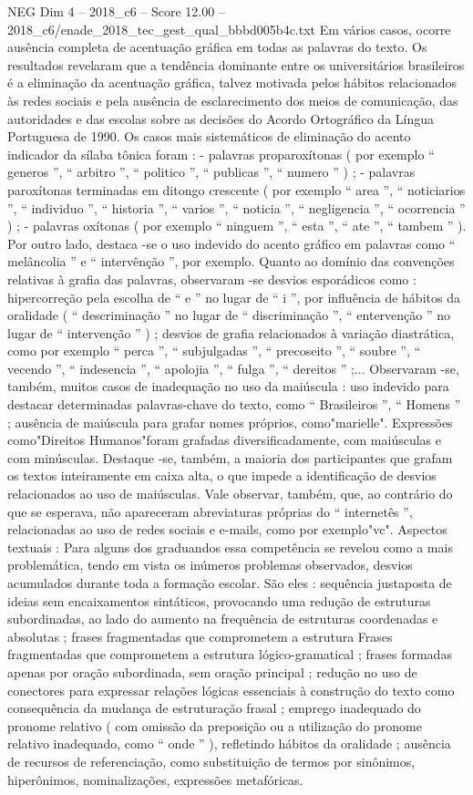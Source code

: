 \begin{textsample}{NEG Dim 4 – 2018\_c6 – Score 12.00 – 2018\_c6/enade\_2018\_tec\_gest\_qual\_bbbd005b4c.txt}
Em vários casos, ocorre ausência completa de acentuação gráfica em todas as palavras do texto.
Os resultados revelaram que a tendência dominante entre os universitários brasileiros é a eliminação da acentuação gráfica, talvez motivada pelos hábitos relacionados às redes sociais e pela ausência de esclarecimento dos meios de comunicação, das autoridades e das escolas sobre as decisões do Acordo Ortográfico da Língua Portuguesa de 1990.
Os casos mais sistemáticos de eliminação do acento indicador da sílaba tônica foram : - palavras proparoxítonas ( por exemplo “ generos ”, “ arbitro ”, “ politico ”, “ publicas ”, “ numero ” ) ; - palavras paroxítonas terminadas em ditongo crescente ( por exemplo “ area ”, “ noticiarios ”, “ individuo ”, “ historia ”, “ varios ”, “ noticia ”, “ negligencia ”, “ ocorrencia ” ) ; - palavras oxítonas ( por exemplo “ ninguem ”, “ esta ”, “ ate ”, “ tambem ” ).
Por outro lado, destaca -se o uso indevido do acento gráfico em palavras como “ melâncolia ” e “ intervênção ”, por exemplo.
Quanto ao domínio das convenções relativas à grafia das palavras, observaram -se desvios esporádicos como : hipercorreção pela escolha de “ e ” no lugar de “ i ”, por influência de hábitos da oralidade ( “ descriminação ” no lugar de “ discriminação ”, “ entervenção ” no lugar de “ intervenção ” ) ; desvios de grafia relacionados à variação diastrática, como por exemplo “ perca ”, “ subjulgadas ”, “ precoseito ”, “ soubre ”, “ vecendo ”, “ indesencia ”, “ apolojia ”, “ fulga ”, “ dereitos ” ;...
Observaram -se, também, muitos casos de inadequação no uso da maiúscula : uso indevido para destacar determinadas palavras-chave do texto, como “ Brasileiros ”, “ Homens ” ; ausência de maiúscula para grafar nomes próprios, como"marielle".
Expressões como"Direitos Humanos"foram grafadas diversificadamente, com maiúsculas e com minúsculas.
Destaque -se, também, a maioria dos participantes que grafam os textos inteiramente em caixa alta, o que impede a identificação de desvios relacionados ao uso de maiúsculas.
Vale observar, também, que, ao contrário do que se esperava, não apareceram abreviaturas próprias do “ internetês ”, relacionadas ao uso de redes sociais e e-mails, como por exemplo"vc".
Aspectos textuais : Para alguns dos graduandos essa competência se revelou como a mais problemática, tendo em vista os inúmeros problemas observados, desvios acumulados durante toda a formação escolar.
São eles : sequência justaposta de ideias sem encaixamentos sintáticos, provocando uma redução de estruturas subordinadas, ao lado do aumento na frequência de estruturas coordenadas e absolutas ; frases fragmentadas que comprometem a estrutura Frases fragmentadas que comprometem a estrutura lógico-gramatical ; frases formadas apenas por oração subordinada, sem oração principal ; redução no uso de conectores para expressar relações lógicas essenciais à construção do texto como consequência da mudança de estruturação frasal ; emprego inadequado do pronome relativo ( com omissão da preposição ou a utilização do pronome relativo inadequado, como “ onde ” ), refletindo hábitos da oralidade ; ausência de recursos de referenciação, como substituição de termos por sinônimos, hiperônimos, nominalizações, expressões metafóricas.

\end{textsample}
